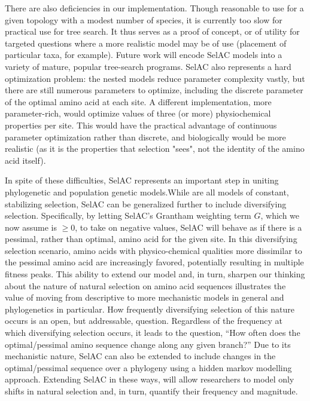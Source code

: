 \documentclass[12pt,letterpaper]{article}
\newcommand{\PC}{physico-chemical\xspace}
\newcommand{\selac}{SelAC\xspace}
\begin{document}
There are also deficiencies in our implementation. 
Though reasonable to use for a given topology with a modest number of species, it is currently too slow for practical use for tree search.
It thus serves as a proof of concept, or of utility for targeted questions where a more realistic model may be of use (placement of particular taxa, for example). 
Future work will encode \selac models into a variety of mature, popular tree-search programs. 
\selac also represents a hard optimization problem: the nested models reduce parameter complexity vastly, but there are still numerous parameters to optimize, including the discrete parameter of the optimal amino acid at each site. 
A different implementation, more parameter-rich, would optimize values of three (or more) physiochemical properties per site. 
This would have the practical advantage of continuous parameter optimization rather than discrete, and biologically would be more realistic (as it is the properties that selection "sees", not the identity of the amino acid itself).

In spite of these difficulties, \selac represents an important step in uniting phylogenetic and population genetic models.While \citet{KoshiEtAl1999,DimmicEtAl2000,KoshiAndGoldstein2001,RobinsonEtAl2003,LartillotAndPhilippe2004,ThorneEtAl2012,RodrigueAndLartillot2014} are all models of constant, stabilizing selection, \selac can be generalized further to include diversifying selection.
Specifically, by letting \selac's Grantham weighting term $G$, which we now assume is $\ge 0$,  to take on negative values, \selac will behave as if there is a pessimal, rather than optimal, amino acid for the given site.
In this diversifying selection scenario, amino acids with \PC qualities more dissimilar to the pessimal amino acid are increasingly favored, potentially resulting in multiple fitness peaks.
This ability to extend our model and, in turn, sharpen our thinking about the nature of natural selection on amino acid sequences illustrates the value of moving from descriptive to more mechanistic models in general and phylogenetics in particular.
How frequently diversifying selection of this nature occurs is an open, but addressable, question.
Regardless of the frequency at which diversifying selection occurs, it leads to the question, ``How often does the optimal/pessimal amino sequence change along any given branch?''
Due to its mechanistic nature, \selac can also be extended to include changes in the optimal/pessimal sequence over a  phylogeny using a hidden markov modelling approach.
Extending \selac in these ways, will allow researchers to model only shifts in natural selection and, in turn, quantify their frequency and magnitude.
\end{document}
